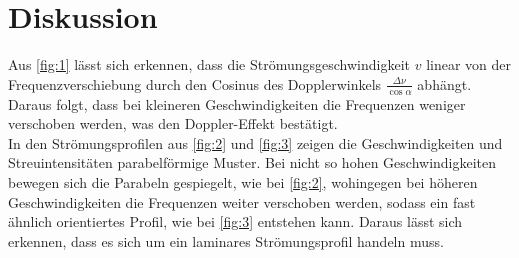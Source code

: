 \section{Diskussion}
Aus \autoref{fig:1} lässt sich erkennen, dass die Strömungsgeschwindigkeit $v$ linear von der Frequenzverschiebung durch den Cosinus des Dopplerwinkels $\frac{\Delta\nu}{\cos{\alpha}}$ abhängt. Daraus folgt, dass bei kleineren Geschwindigkeiten die Frequenzen weniger verschoben werden, was den Doppler-Effekt bestätigt.\\
In den Strömungsprofilen aus \autoref{fig:2} und \autoref{fig:3} zeigen die Geschwindigkeiten und Streuintensitäten parabelförmige Muster. Bei nicht so hohen Geschwindigkeiten bewegen sich die Parabeln gespiegelt, wie bei \autoref{fig:2}, wohingegen bei höheren Geschwindigkeiten die Frequenzen weiter verschoben werden, sodass ein fast ähnlich orientiertes Profil, wie bei \autoref{fig:3} entstehen kann. Daraus lässt sich erkennen, dass es sich um ein laminares Strömungsprofil handeln muss.

